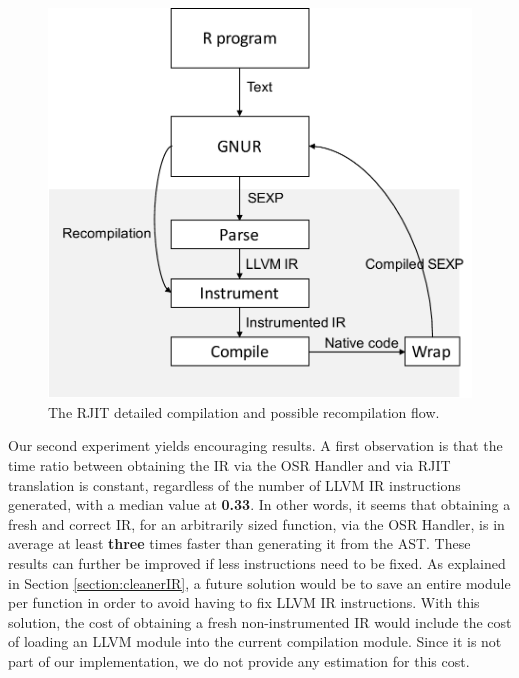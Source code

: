 \begin{figure}[h!]
\center
\includegraphics[scale=0.5]{Figures/RjitFlowRecomp.pdf}
\caption{The RJIT detailed compilation and possible recompilation flow.}
\label{fig:rjitrecompflow}
\end{figure}

Our second experiment yields encouraging results.
A first observation is that the time ratio between obtaining the IR via the OSR Handler and via RJIT translation is constant, regardless of the number of LLVM IR instructions generated, with a median value at \textbf{0.33}. 
In other words, it seems that obtaining a fresh and correct IR, for an arbitrarily sized function, via the OSR Handler, is in average at least \textbf{three} times faster than generating it from the AST.
These results can further be improved if less instructions need to be fixed.
As explained in Section \ref{section:cleanerIR}, a future solution would be to save an entire module per function in order to avoid having to fix LLVM IR instructions.
With this solution, the cost of obtaining a fresh non-instrumented IR would include the cost of loading an LLVM module into the current compilation module. 
Since it is not part of our implementation, we do not provide any estimation for this cost.\\


